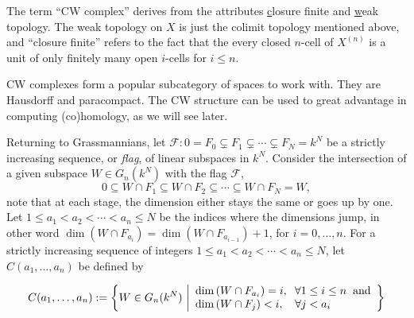 \documentclass[a4paper,openany]{scrbook}
\begin{document}
\begin{remark}
The term ``CW complex'' derives from the attributes \underline{c}losure finite and \underline{w}eak topology. The weak topology on $X$ is just the colimit topology mentioned above, and ``closure finite'' refers to the fact that the every closed $n$-cell of $X^{(n)}$ is a unit of only finitely many open $i$-cells for $i \leq n$.
\end{remark}

CW complexes form a popular subcategory of spaces to work with. They are Hausdorff and paracompact. The CW structure can be used to great advantage in computing (co)homology, as we will see later.

Returning to Grassmannians, let $\mathcal{F}\colon 0=F_0\subsetneq F_1\subsetneq \cdots \subsetneq F_N = k^N$
be a strictly increasing sequence, or \textit{flag}, of linear subspaces in $k^N$. Consider the intersection of a given subspace $W\in G_n(k^N)$ with the flag $\mathcal{F}$,
\begin{equation*}
0\subseteq W\cap F_1 \subseteq W\cap F_2\subseteq\cdots \subseteq W\cap F_N=W,
\end{equation*}
note that at each stage, the dimension either stays the same or goes up by one. \linebreak Let $1\leq a_1<a_2<\cdots <a_n\leq N$ be the indices where the dimensions jump, in other word $\dim(W\cap F_{a_i})=\dim(W\cap F_{a_{i-1}}) +1$, for $i=0,\dots ,n$.
For a strictly increasing sequence of integers $1\leq a_1<a_2<\cdots <a_n\leq N$, let $C(a_1,\dots ,a_n)$ be defined by

\[
C(a_1,\dots ,a_n) := \left\{  W\in G_n(k^N)\ \middle\vert \begin{array}{l}
   \dim\left(W\cap F_{a_i}\right)=i, \hspace*{0.2cm}\forall 1\leq i\leq n \hspace*{0.2cm}  \text{and} \\
    \dim\left(W\cap F_{j}\right)<i,\hspace*{0.34cm}\forall j<a_i
  \end{array}\right\}
\]
\end{document}
